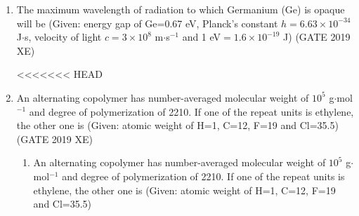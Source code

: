 \documentclass[journal,12pt,onecolumn]{IEEEtran}
\begin{document}
\begin{enumerate}
\item The maximum wavelength of radiation to which Germanium (Ge) is opaque will be (Given: energy gap of Ge=0.67 eV, Planck's constant $h=6.63\times10^{-34}$ J$\cdot$s, velocity of light $c=3\times10^{8}$ m$\cdot$s$^{-1}$ and 1 eV$=1.6\times10^{-19}$ J)
\hfill{(GATE 2019 XE)} \\

\begin{multicols}{2}
<<<<<<< HEAD
\end{multicols}

\item An alternating copolymer has number-averaged molecular weight of $10^{5}$ g$\cdot$mol$^{-1}$ and degree of polymerization of 2210. If one of the repeat units is ethylene, the other one is (Given: atomic weight of H=1, C=12, F=19 and Cl=35.5)
\hfill{(GATE 2019 XE)} \\
\begin{multicols}{2}
\begin{enumerate}
=======

\vspace{0.5cm}

\item An alternating copolymer has number-averaged molecular weight of $10^{5}$ g$\cdot$mol$^{-1}$ and degree of polymerization of 2210. If one of the repeat units is ethylene, the other one is (Given: atomic weight of H=1, C=12, F=19 and Cl=35.5)
\hfill{} \\


\end{enumerate}
\end{multicols}
\end{enumerate}
\end{document}
